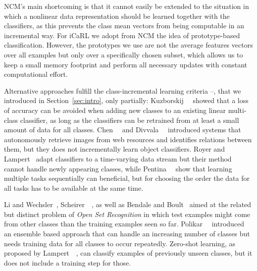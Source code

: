 \documentclass[10pt,twocolumn,letterpaper]{article}
\begin{document}
NCM's main shortcoming is that it cannot easily be extended 
to the situation in which a nonlinear data representation should
be learned together with the classifiers, as this prevents 
the class mean vectors from being computable in an incremental
way. 
For iCaRL we adopt from NCM the idea of prototype-based classification. 
However, the prototypes we use are not the average features vectors 
over all examples but only over a specifically chosen subset, which 
allows us to keep a small memory footprint and perform all necessary 
updates with constant computational effort.

Alternative approaches fulfill the class-incremental learning 
criteria --, that we introduced in Section~\ref{sec:intro},
only partially: 
Kuzborskij~\etal~\cite{kuzborskij2013n} showed that a loss of 
accuracy can be avoided when adding new classes to an existing 
linear multi-class classifier, as long as the classifiers can
be retrained from at least a small amount of data for all 
classes.
Chen~\etal~\cite{chen2013,chen2014} and Divvala~\etal~\cite{Divvala_2014_CVPR}
introduced systems that autonomously retrieve images from web resources 
and identifies relations between them, but they does not incrementally 
learn object classifiers. 
Royer and Lampert~\cite{royer-cvpr2015} adapt classifiers 
to a time-varying data stream
but their method cannot handle newly appearing classes, 
while Pentina~\etal~\cite{pentina-cvpr2015} show that 
learning multiple tasks sequentially can beneficial, but 
for choosing the order the data for all tasks has to be 
available at the same time.

Li and Wechsler~\cite{li2005open}, Scheirer~\etal~\cite{Scheirer_2013_TPAMI},
as well as Bendale and Boult~\cite{Bendale_2015_CVPR} aimed at the 
related but distinct problem of \emph{Open Set Recognition} in 
which test examples might come from other classes than the training 
examples seen so far. 
Polikar~\etal~\cite{MuhlbaierTP09,PolikarUUH01} introduced an 
ensemble based approach that can handle an increasing number of 
classes but needs training data for all classes to occur 
repeatedly.
Zero-shot learning, as proposed by Lampert~\etal~\cite{lampert-tpami2013}, 
can classify examples of previously unseen classes, 
but it does not include a training step for those.
\end{document}
